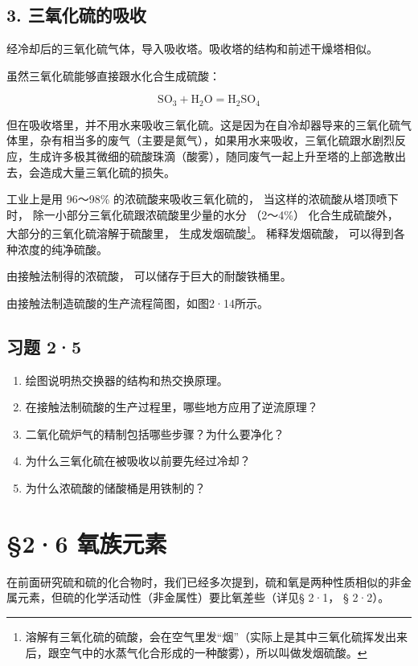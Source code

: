 \subsection{3. 三氧化硫的吸收}

经冷却后的三氧化硫气体，导入吸收塔。吸收塔的结构和前述干燥塔相似。

虽然三氧化硫能够直接跟水化合生成硫酸：

\[
\mathrm{SO} _ {3} + \mathrm{H} _ {2} \mathrm{O} = \mathrm{H} _ {2} \mathrm{SO} _ {4}
\]

但在吸收塔里，并不用水来吸收三氧化硫。这是因为在自冷却器导来的三氧化硫气体里，杂有相当多的废气（主要是氮气），如果用水来吸收，三氧化硫跟水剧烈反应，生成许多极其微细的硫酸珠滴（酸雾），随同废气一起上升至塔的上部逸散出去，会造成大量三氧化硫的损失。

工业上是用 96～98\% 的浓硫酸来吸收三氧化硫的，
当这样的浓硫酸从塔顶喷下时， 除一小部分三氧化硫跟浓硫酸里少量的水分
（2～4\%） 化合生成硫酸外， 大部分的三氧化硫溶解于硫酸里，
生成发烟硫酸\footnote{溶解有三氧化硫的硫酸，会在空气里发``烟''（实际上是其中三氧化硫挥发出来后，跟空气中的水蒸气化合形成的一种酸雾），所以叫做发烟硫酸。}。
稀释发烟硫酸， 可以得到各种浓度的纯净硫酸。

由接触法制得的浓硫酸， 可以储存于巨大的耐酸铁桶里。

由接触法制造硫酸的生产流程简图，如图2·14所示。

\subsection{习题 2·5}

\begin{enumerate}
\item
  绘图说明热交换器的结构和热交换原理。
\item
  在接触法制硫酸的生产过程里，哪些地方应用了逆流原理？
\item
  二氧化硫炉气的精制包括哪些步骤？为什么要净化？
\item
  为什么三氧化硫在被吸收以前要先经过冷却？
\item
  为什么浓硫酸的储酸桶是用铁制的？
\end{enumerate}

\section{§2·6 氧族元素}

在前面研究硫和硫的化合物时，我们已经多次提到，硫和氧是两种性质相似的非金属元素，但硫的化学活动性（非金属性）要比氧差些（详见§
2·1， § 2·2）。

